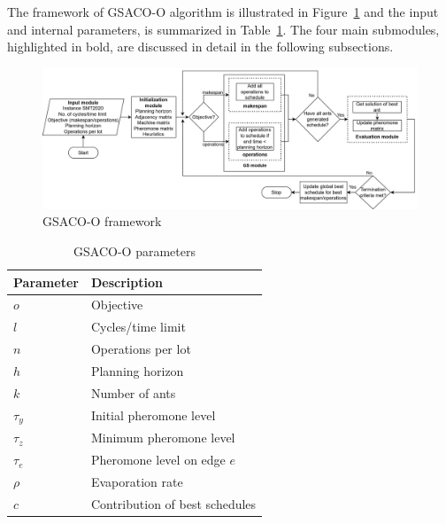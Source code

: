 The framework of GSACO-O algorithm is illustrated in Figure~\ref{fig:aco-flowchart} and the input and internal parameters, 
is summarized in Table~\ref{tab:parameters}. 
The four main submodules, highlighted in bold, are discussed in detail in the following subsections.

\begin{figure}[t]
	\includegraphics[width=\textwidth]{aco-flowchart.png}
	\caption{GSACO-O framework}
	\label{fig:aco-flowchart}
\end{figure}

\begin{table}[t]
	\caption{GSACO-O parameters}\label{tab:parameters} \centering
	\begin{tabular}{|l|l|}
		\hline
		Parameter & Description \\ \hline
		$o$ & Objective \\
		$l$ & Cycles/time limit        \\
		$n$ & Operations per lot \\
		$h$ & Planning horizon \\
		$k$ & Number of ants \\
		$\tau_{y}$ & Initial pheromone level \\
		$\tau_{z}$ & Minimum pheromone level \\
		$\tau_{e}$ & Pheromone level on edge $e$ \\
		$\rho$ & Evaporation rate \\
		$c$ & Contribution of best schedules \\
		\hline
	\end{tabular}
\end{table}

